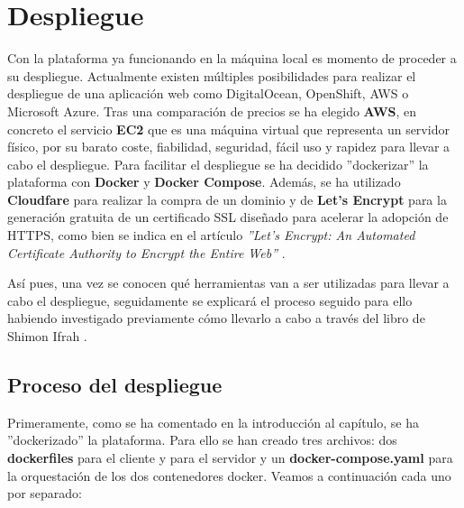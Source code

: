 \chapter{Despliegue} \label{despliegue}

Con la plataforma ya funcionando en la máquina local es momento de proceder a su despliegue. Actualmente existen múltiples posibilidades para realizar el despliegue de una aplicación web como DigitalOcean, OpenShift, AWS o Microsoft Azure. Tras una comparación de precios se ha elegido \textbf{AWS}, en concreto el servicio \textbf{EC2} que es una máquina virtual que representa un servidor físico, por su barato coste, fiabilidad, seguridad, fácil uso y rapidez para llevar a cabo el despliegue. Para facilitar el despliegue se ha decidido ''dockerizar'' la plataforma con \textbf{Docker} y \textbf{Docker Compose}. Además, se ha utilizado \textbf{Cloudfare} para realizar la compra de un dominio y de \textbf{Let's Encrypt} para la generación gratuita de un certificado SSL diseñado para acelerar la adopción de HTTPS, como bien se indica en el artículo \textit{''Let’s Encrypt: An Automated Certificate
Authority to Encrypt the Entire Web''} \cite{aas2019let}. \bigskip

Así pues, una vez se conocen qué herramientas van a ser utilizadas para llevar a cabo el despliegue, seguidamente se explicará el proceso seguido para ello habiendo investigado previamente cómo llevarlo a cabo a través del libro de Shimon Ifrah \cite{ifrah2019installing}.

\section{Proceso del despliegue}
Primeramente, como se ha comentado en la introducción al capítulo, se ha ''dockerizado'' la plataforma. Para ello se han creado tres archivos: dos \textbf{dockerfiles} para el cliente y para el servidor y un \textbf{docker-compose.yaml} para la orquestación de los dos contenedores docker. Veamos a continuación cada uno por separado:

